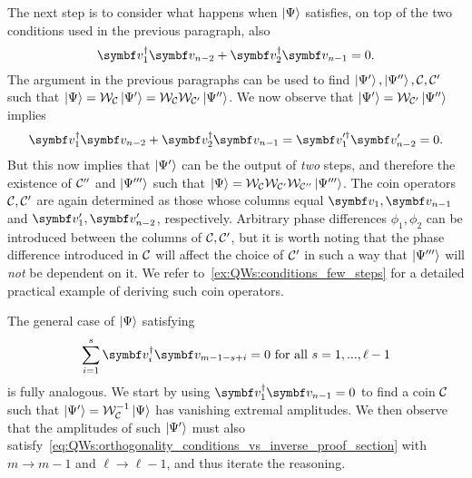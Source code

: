 The next step is to consider what happens when $\ket\Psi$ satisfies, on top of the two conditions used in the previous paragraph, also
\begin{equation}
    \bs v_1^\dagger \bs v_{n-2}+\bs v_2^\dagger \bs v_{n-1}=0.
    \label{eq:QWs:orthogonality_on_vs_proving_otherdirection}
\end{equation}
The argument in the previous paragraphs can be used to find $\ket{\Psi'},\ket{\Psi''},{\mathcal{C}},{\mathcal{C}}'$ such that
$\ket\Psi={\mathcal{W}}_{\mathcal{C}}\ket{\Psi'}={\mathcal{W}}_{\mathcal{C}}{\mathcal{W}}_{{\mathcal{C}}'}\ket{\Psi''}$.
We now observe that $\ket{\Psi'}={\mathcal{W}}_{{\mathcal{C}}'}\ket{\Psi''}$ implies
\begin{equation}
    \bs v_1^\dagger \bs v_{n-2}+\bs v_2^\dagger \bs v_{n-1} =
    \bs v_1'^\dagger \bs v_{n-2}' = 0.
\end{equation}
But this now implies that $\ket{\Psi'}$ can be the output of \emph{two} steps, and therefore the existence of ${\mathcal{C}}''$ and $\ket{\Psi'''}$ such that
$\ket\Psi={\mathcal{W}}_{\mathcal{C}}{\mathcal{W}}_{{\mathcal{C}}'}{\mathcal{W}}_{{\mathcal{C}}''}\ket{\Psi'''}$.
The coin operators ${\mathcal{C}},{\mathcal{C}}'$ are again determined as those whose columns equal $\bs v_1,\bs v_{n-1}$ and $\bs v_1',\bs v_{n-2}'$, respectively. Arbitrary phase differences $\phi_1,\phi_2$ can be introduced between the columns of ${\mathcal{C}},{\mathcal{C}}'$, but it is worth noting that the phase difference introduced in ${\mathcal{C}}$ will affect the choice of ${\mathcal{C}}'$ in such a way that $\ket{\Psi'''}$ will \emph{not} be dependent on it.
We refer to~\cref{ex:QWs:conditions_few_steps} for a detailed practical example of deriving such coin operators.

The general case of $\ket\Psi$ satisfying
\begin{equation}
    \sum_{i=1}^s \bs v_i^\dagger \bs v_{m-1-s+i}=0
    \text{ for all }s=1,...,\ell-1
    \label{eq:QWs:orthogonality_conditions_vs_inverse_proof_section}
\end{equation}
is fully analogous. We start by using $\bs v_1^\dagger \bs v_{n-1}=0$ to find a coin ${\mathcal{C}}$ such that $\ket{\Psi'}={\mathcal{W}}_{{\mathcal{C}}}^{-1}\ket\Psi$ has vanishing extremal amplitudes. We then observe that the amplitudes of such $\ket{\Psi'}$ must also satisfy~\cref{eq:QWs:orthogonality_conditions_vs_inverse_proof_section} with $m\to m-1$ and $\ell\to\ell-1$, and thus iterate the reasoning.



